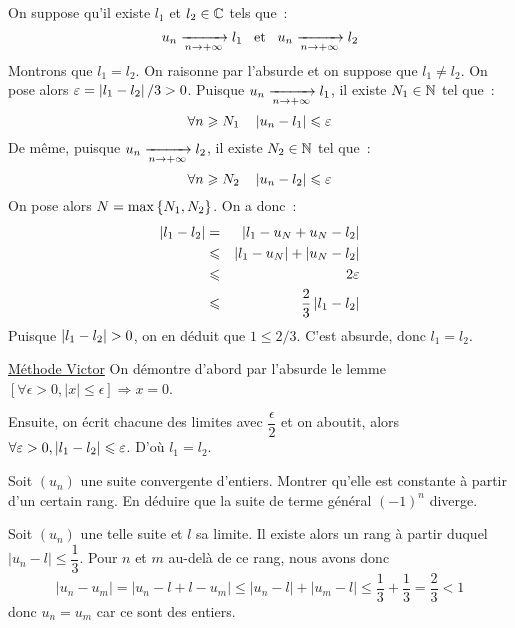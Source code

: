 \documentclass{magnolia}
\begin{document}
\begin{preuve}
On suppose qu'il existe $l_1$ et $l_2\in\mathbb{C}$ tels que~:
\[u_n\xrightarrow[n\rightarrow +\infty]{} l_1 \quad\!\text{et}\quad\! u_n\xrightarrow[n\rightarrow +\infty]{} l_2\]
Montrons que $l_1=l_2$. On raisonne par l'absurde et on suppose que
$l_1\neq l_2$. On pose alors $\varepsilon=\left|l_1-l_2\right|/3>0$. Puisque
$u_n\xrightarrow[n\rightarrow +\infty]{}l_1$, il existe $N_1\in\mathbb{N}$ tel que~:
\[\forall n\geqslant N_1 \quad \left|u_n-l_1\right|\leqslant \varepsilon\]
De même, puisque $u_n\xrightarrow[n\rightarrow +\infty]{}l_2$, il existe $N_2\in\mathbb{N}$ tel que~:
\[\forall n\geqslant N_2 \quad \left|u_n-l_2\right|\leqslant \varepsilon\]
On pose alors $N=\max\left\{N_1,N_2\right\}$. On a donc~:
\begin{eqnarray*}
\left|l_1-l_2\right|
&=& \left|l_1-u_N+u_N-l_2\right|\\
&\leqslant& \left|l_1-u_N\right| + \left|u_N-l_2\right|\\
&\leqslant& 2\varepsilon\\
&\leqslant& \frac{2}{3}\left|l_1-l_2\right|
\end{eqnarray*}
Puisque $\abs{l_1-l_2}>0$, on en déduit que $1\leq 2/3$. C'est absurde, donc
$l_1=l_2$.\\
\begin{victor}
\underline{Méthode Victor} On démontre d'abord par l'absurde le lemme $\left[\forall \epsilon>0, |x|\leq \epsilon \right] \Longrightarrow x=0$.

Ensuite, on écrit chacune des limites avec $\dfrac{\epsilon}{2}$ et on aboutit, alors $\forall \varepsilon>0, \left|l_1-l_2\right|\leqslant \varepsilon$. D'où $l_1=l_2$.
\end{victor}
\end{preuve}

\begin{exoUnique}
\exo Soit $(u_n)$ une suite convergente d'entiers. Montrer qu'elle
  est constante à partir d'un certain rang. En déduire que la suite de
  terme général $(-1)^n$ diverge.
\end{exoUnique}

\begin{sol}
Soit $(u_n)$ une telle suite et $l$ sa limite. Il existe alors un rang à partir duquel $|u_n-l|\leq \dfrac{1}{3}$. Pour $n$ et $m$ au-delà de ce rang, nous avons donc \[|u_n-u_m|=|u_n-l+l-u_m|\leq|u_n-l|+|u_m-l|\leq \dfrac{1}{3}+\dfrac{1}{3}=\dfrac{2}{3}<1\] donc $u_n=u_m$ car ce sont des entiers.

\end{sol}
\end{document}
